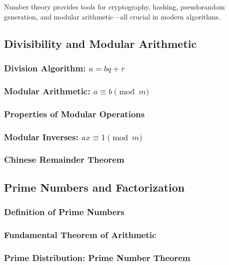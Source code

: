 \begin{sectionintro}
Number theory provides tools for cryptography, hashing, pseudorandom generation,
and modular arithmetic—all crucial in modern algorithms.
\end{sectionintro}

\subsection{Divisibility and Modular Arithmetic}
\label{subsec:divisibility}

\subsubsection{Division Algorithm: $a = bq + r$}
\subsubsection{Modular Arithmetic: $a \equiv b \pmod{m}$}
\subsubsection{Properties of Modular Operations}
\subsubsection{Modular Inverses: $ax \equiv 1 \pmod{m}$}
\subsubsection{Chinese Remainder Theorem}

\subsection{Prime Numbers and Factorization}
\label{subsec:primes}

\subsubsection{Definition of Prime Numbers}
\subsubsection{Fundamental Theorem of Arithmetic}
\subsubsection{Prime Distribution: Prime Number Theorem}
